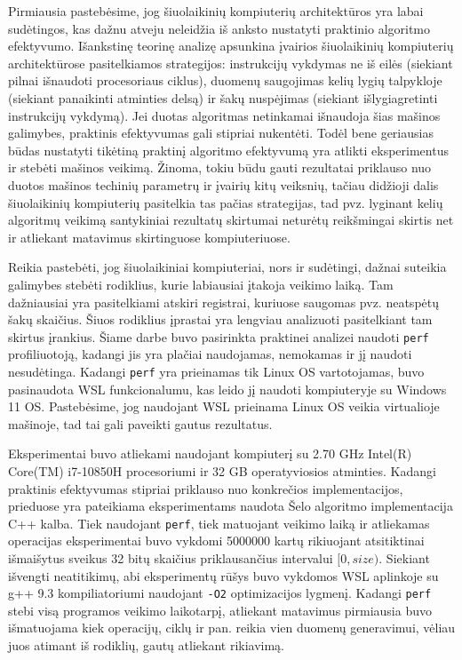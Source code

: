 \documentclass{VUMIFInfBakalaurinis}
\begin{document}
Pirmiausia pastebėsime, jog šiuolaikinių kompiuterių architektūros yra labai sudėtingos, kas dažnu atveju neleidžia iš anksto nustatyti praktinio algoritmo efektyvumo.
Išankstinę teorinę analizę apsunkina įvairios šiuolaikinių kompiuterių architektūrose pasitelkiamos strategijos:
instrukcijų vykdymas ne iš eilės (siekiant pilnai išnaudoti procesoriaus ciklus),
duomenų saugojimas kelių lygių talpykloje (siekiant panaikinti atminties delsą) ir
šakų nuspėjimas (siekiant išlygiagretinti instrukcijų vykdymą).
Jei duotas algoritmas netinkamai išnaudoja šias mašinos galimybes, praktinis efektyvumas gali stipriai nukentėti.
Todėl bene geriausias būdas nustatyti tikėtiną praktinį algoritmo efektyvumą yra atlikti eksperimentus ir stebėti mašinos veikimą.
Žinoma, tokiu būdu gauti rezultatai priklauso nuo duotos mašinos techinių parametrų ir įvairių kitų veiksnių, tačiau didžioji dalis
šiuolaikinių kompiuterių pasitelkia tas pačias strategijas, tad pvz. lyginant kelių algoritmų veikimą
santykiniai rezultatų skirtumai neturėtų reikšmingai skirtis net ir atliekant matavimus skirtinguose kompiuteriuose.  

Reikia pastebėti, jog šiuolaikiniai kompiuteriai, nors ir sudėtingi, dažnai suteikia galimybes stebėti rodiklius, kurie labiausiai įtakoja veikimo laiką.
Tam dažniausiai yra pasitelkiami atskiri registrai, kuriuose saugomas pvz. neatspėtų šakų skaičius.
Šiuos rodiklius įprastai yra lengviau analizuoti pasitelkiant tam skirtus įrankius.
Šiame darbe buvo pasirinkta praktinei analizei naudoti \verb|perf| profiliuotoją, kadangi jis yra plačiai naudojamas, nemokamas ir jį naudoti nesudėtinga.
Kadangi \verb|perf| yra prieinamas tik Linux OS vartotojamas, buvo pasinaudota WSL funkcionalumu, kas leido jį naudoti kompiuteryje su Windows 11 OS.
Pastebėsime, jog naudojant WSL prieinama Linux OS veikia virtualioje mašinoje, tad tai gali paveikti gautus rezultatus. 

Eksperimentai buvo atliekami naudojant kompiuterį su 2.70 GHz Intel(R) Core(TM) i7-10850H procesoriumi ir 32 GB operatyviosios atminties.
Kadangi praktinis efektyvumas stipriai priklauso nuo konkrečios implementacijos, prieduose yra pateikiama eksperimentams naudota Šelo algoritmo implementacija C++ kalba.
Tiek naudojant \verb|perf|, tiek matuojant veikimo laiką ir atliekamas operacijas eksperimentai buvo vykdomi 5000000 kartų rikiuojant
atsitiktinai išmaišytus sveikus 32 bitų skaičius priklausančius intervalui $[0, size)$.
Siekiant išvengti neatitikimų, abi eksperimentų rūšys buvo vykdomos WSL aplinkoje su g++ 9.3 kompiliatoriumi naudojant \verb|-O2| optimizacijos lygmenį.
Kadangi \verb|perf| stebi visą programos veikimo laikotarpį, atliekant matavimus pirmiausia buvo išmatuojama kiek operacijų, ciklų ir pan. reikia vien duomenų generavimui,
vėliau juos atimant iš rodiklių, gautų atliekant rikiavimą.
\end{document}
